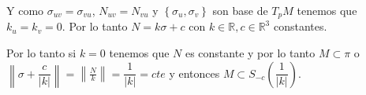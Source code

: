 \documentclass[11pt]{article}
\newcommand{\R}{{\mathbb{R}}}
\newcommand\norm[1]{\left\lVert#1\right\rVert}
\newcommand\abs[1]{\left\lvert#1\right\rvert}
\newcommand{\sett}[1]{\left\lbrace#1\right\rbrace}
\newenvironment{proof}[1][Demostraci\'on]{\begin{trivlist}
		\item[\hskip \labelsep {\bfseries #1}]}{\end{trivlist}}
\newcommand{\qed}{\nobreak \ifvmode \relax \else
	\ifdim\lastskip<1.5em \hskip-\lastskip
	\hskip1.5em plus0em minus0.5em \fi \nobreak
	\vrule height0.75em width0.5em depth0.25em\fi}
\begin{document}
\begin{enumerate}
\begin{proof}
		Y como $\sigma_{uv} = \sigma_{vu}$, $N_{uv} = N_{vu}$ y $\sett{\sigma_u , \sigma_v}$ son base de $T_pM$ tenemos que $k_u = k_v = 0$. Por lo tanto $N = k \sigma + c$ con $k \in \R, c \in \R^3$ constantes.
		
		Por lo tanto si $k = 0$ tenemos que $N$ es constante y por lo tanto $M \subset \pi$ o $\norm{\sigma + \dfrac{c}{\abs{k}}} = \norm{\frac{N}{k}} = \dfrac{1}{\abs{k}} = cte$ y entonces $M \subset S_{-c}(\dfrac{1}{\abs{k}})$. \qed
		
		
	\end{proof}
	
\end{enumerate}
	
\end{document}
